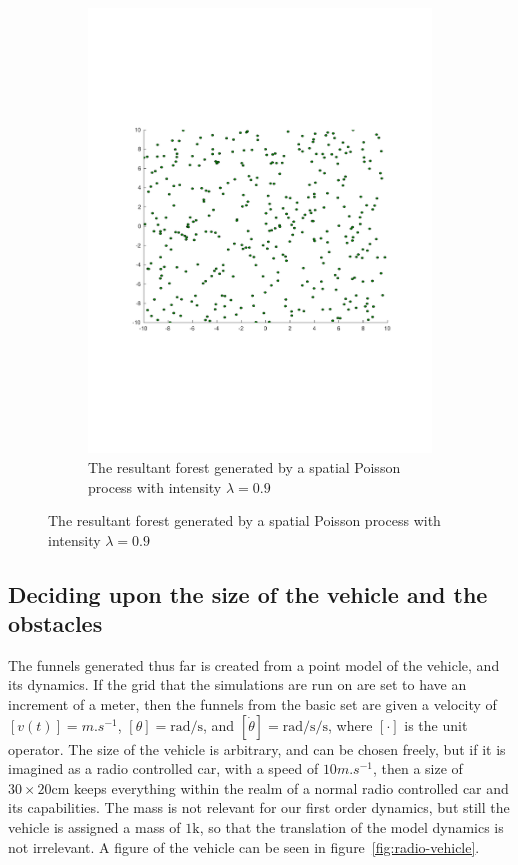 \begin{figure}
\begin{subfigure}[b]{0.5\textwidth}
    \includegraphics[width=\textwidth]{figures/experiments/poisson09}
    \caption{The resultant forest generated by a spatial Poisson process with
      intensity \(\lambda = 0.9\)}
    \label{fig:poisson09}
  \end{subfigure}
\end{figure}

\subsection{Deciding upon the size of the vehicle and the obstacles}
\label{subsec:deciding-model-size}

The funnels generated thus far is created from a point model of the vehicle, and
its dynamics. If the grid that the simulations are run on are set to have an
increment of a meter, then the funnels from the basic set are given a velocity
of \([v(t)] = \si{m.s^{-1}}\), \([\theta] = \si{\radian\per\second}\), and
\([\dot{\theta}] = \si{\radian\per\second\per\second}\), where \([\cdot]\) is
the unit operator. The size of the vehicle is arbitrary, and can be chosen
freely, but if it is imagined as a radio controlled car, with a speed of
\(10\si{m.s^{-1}}\), then a size of \(30 \times 20 \si{\centi\metre} \) keeps
everything within the realm of a normal radio controlled car and its
capabilities. The mass is not relevant for our first order dynamics, but still
the vehicle is assigned a mass of \(1 \si{\kilo}\), so that the translation of
the model dynamics is not irrelevant. A figure of the vehicle can be seen in
figure~\cref{fig:radio-vehicle}.

